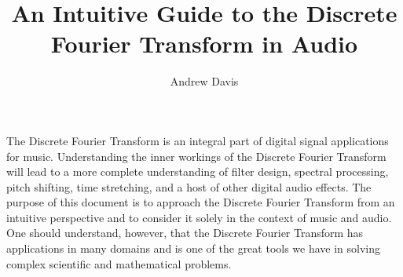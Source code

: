\documentclass{article}
\title{An Intuitive Guide to the Discrete Fourier Transform in Audio}
\author{Andrew Davis}
\begin{document}
	\maketitle
	
	The Discrete Fourier Transform is an integral part of digital signal applications for music.  Understanding the
	inner workings of the Discrete Fourier Transform  will lead to a more complete understanding of filter
	design, spectral processing, pitch shifting, time stretching, and a host of other digital audio effects.  The 
	purpose of this document is to approach the Discrete Fourier Transform from an intuitive perspective and to
	consider it solely in the context of music and audio.  One should understand, however, that the Discrete 
	Fourier Transform 
	has applications in many domains and is one of the great tools we have in solving complex scientific and 
	mathematical problems.  
	
	
	
	
	
	
	
	
	\newpage
\end{document}
